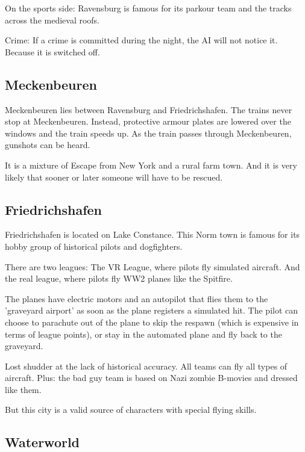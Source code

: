 On the sports side: Ravensburg is famous for its parkour team and the tracks across the medieval roofs.

Crime: If a crime is committed during the night, the AI will not notice it. Because it is switched off.

\subsection{Meckenbeuren}
\label{subsec:Meckenbeuren}

Meckenbeuren lies between Ravensburg and Friedrichshafen. The trains never stop at Meckenbeuren. Instead, protective armour plates are lowered over the windows and the train speeds up. As the train passes through Meckenbeuren, gunshots can be heard.

It is a mixture of Escape from New York and a rural farm town. And it is very likely that sooner or later someone will have to be rescued.

\subsection{Friedrichshafen}
\label{subsec:Friedrichshafen}

Friedrichshafen is located on Lake Constance. This Norm town is famous for its hobby group of historical pilots and dogfighters.

There are two leagues: The VR League, where pilots fly simulated aircraft. And the real league, where pilots fly WW2 planes like the Spitfire.

The planes have electric motors and an autopilot that flies them to the 'graveyard airport' as soon as the plane registers a simulated hit.
The pilot can choose to parachute out of the plane to skip the respawn (which is expensive in terms of league points), or stay in the automated plane and fly back to the graveyard.

Lost shudder at the lack of historical accuracy. All teams can fly all types of aircraft. Plus: the bad guy team is based on Nazi zombie B-movies and dressed like them.

But this city is a valid source of characters with special flying skills.

\subsection{Waterworld}
\label{subsec:Waterworld}

